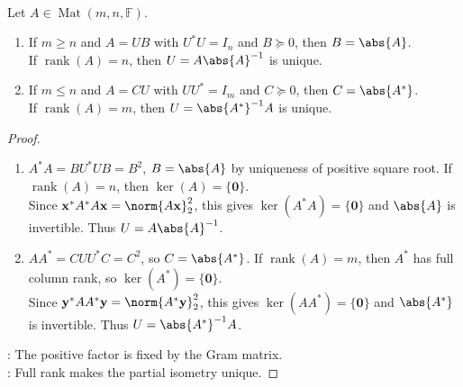 \begin{theorem} \label{thm:polar-factor-uniqueness} \\
Let $A\in\operatorname{Mat}(m,n,\mathbb{F})$.
\begin{enumerate}[label=(\roman*)]
\setlength{\itemsep}{0pt}
\item If $m\geq n$ and $A=UB$ with $U^*U=I_n$ and $B\succeq0$, then $B=\abs{A}$.\\
If $\operatorname{rank}(A)=n$, then $U=A\abs{A}^{-1}$ is unique.
\item If $m\leq n$ and $A=CU$ with $UU^*=I_m$ and $C\succeq0$, then $C=\abs{A^*}$.\\
If $\operatorname{rank}(A)=m$, then $U=\abs{A^*}^{-1}A$ is unique.
\end{enumerate}
\begin{proof}
\begin{enumerate}[label=(\roman*)]
\setlength{\itemsep}{0pt}
\item $A^*A=BU^*UB=B^2$, $B=\abs{A}$ by uniqueness of positive square root. If $\operatorname{rank}(A)=n$, then $\ker(A)=\{\mathbf{0}\}$.\\
Since $\mathbf{x}^*A^*A\mathbf{x}=\norm{A\mathbf{x}}_2^2$, this gives $\ker(A^*A)=\{\mathbf{0}\}$ and $\abs{A}$ is invertible. Thus $U=A\abs{A}^{-1}$.
\item $AA^*=CUU^*C=C^2$, so $C=\abs{A^*}$. If $\operatorname{rank}(A)=m$, then $A^*$ has full column rank, so $\ker(A^*)=\{\mathbf{0}\}$.\\
Since $\mathbf{y}^*AA^*\mathbf{y}=\norm{A^*\mathbf{y}}_2^2$, this gives $\ker(AA^*)=\{\mathbf{0}\}$ and $\abs{A^*}$ is invertible. Thus $U=\abs{A^*}^{-1}A$.
\end{enumerate}
: The positive factor is fixed by the Gram matrix.\\
: Full rank makes the partial isometry unique.
\end{proof}
\end{theorem}

